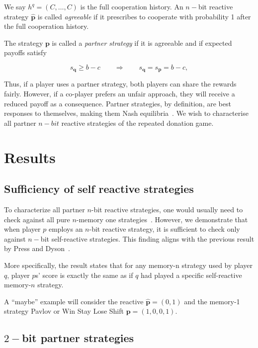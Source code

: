 \documentclass{article}
\theoremstyle{definition}
\begin{document}
We say $\!h^q\!=\!(C,\ldots,C)$ is the full cooperation history. An $n-$bit
reactive strategy $\mathbf{\hat{p}}$ is called {\it agreeable} if it prescribes to
cooperate with probability 1 after the full cooperation history.

The strategy $\mathbf{p}$ is called a {\it partner strategy} if it is agreeable
and if expected payoffs satisfy

\begin{equation} \label{Eq:partner}
    s_{\mathbf{q}} \geq b\!-\!c \qquad \Rightarrow \qquad s_{\mathbf{q}} = s_{\mathbf{p}} =  b\!-\!c,
\end{equation}

Thus, if a player uses a partner strategy, both players can share the rewards
fairly. However, if a co-player prefers an unfair approach, they will receive a
reduced payoff as a consequence. Partner strategies, by definition, are best
responses to themselves, making them Nash equilibria~\cite{Hilbe:GEB:2015}. We
wish to characterise all partner $n-bit$ reactive strategies of the repeated
donation game.

\section{Results}

\subsection{Sufficiency of self reactive strategies}

To characterize all partner $n$-bit reactive strategies, one would usually
need to check against all pure $n$-memory one strategies~\cite{mcavoy:PRSA:2019}.
However, we demonstrate that when player $p$ employs an $n$-bit reactive strategy,
it is sufficient to check only against $n-$bit self-reactive strategies. This
finding aligns with the previous result by Press and Dyson~\cite{press:PNAS:2012}.

More specifically, the result states that for any memory-n strategy used by
player $q$, player $p$s' score is exactly the same as if $q$ had played a
specific self-reactive memory-$n$ strategy.

A ``maybe'' example will consider the reactive $\mathbf{\hat{p}} = (0, 1)$ and the
memory-1 strategy Pavlov or Win Stay Lose Shift $\mathbf{p} = (1, 0, 0, 1)$.

\subsection{$2-$bit partner strategies}
\end{document}

